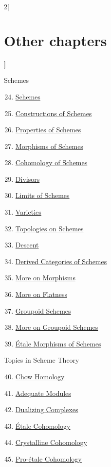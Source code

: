 \begin{multicols}{2}[\section{Other chapters}]
\begin{enumerate}
\end{enumerate}
Schemes
\begin{enumerate}
\setcounter{enumi}{23}
\item \hyperref[schemes-section-phantom]{Schemes}
\item \hyperref[constructions-section-phantom]{Constructions of Schemes}
\item \hyperref[properties-section-phantom]{Properties of Schemes}
\item \hyperref[morphisms-section-phantom]{Morphisms of Schemes}
\item \hyperref[coherent-section-phantom]{Cohomology of Schemes}
\item \hyperref[divisors-section-phantom]{Divisors}
\item \hyperref[limits-section-phantom]{Limits of Schemes}
\item \hyperref[varieties-section-phantom]{Varieties}
\item \hyperref[topologies-section-phantom]{Topologies on Schemes}
\item \hyperref[descent-section-phantom]{Descent}
\item \hyperref[perfect-section-phantom]{Derived Categories of Schemes}
\item \hyperref[more-morphisms-section-phantom]{More on Morphisms}
\item \hyperref[flat-section-phantom]{More on Flatness}
\item \hyperref[groupoids-section-phantom]{Groupoid Schemes}
\item \hyperref[more-groupoids-section-phantom]{More on Groupoid Schemes}
\item \hyperref[etale-section-phantom]{\'Etale Morphisms of Schemes}
\end{enumerate}
Topics in Scheme Theory
\begin{enumerate}
\setcounter{enumi}{39}
\item \hyperref[chow-section-phantom]{Chow Homology}
\item \hyperref[adequate-section-phantom]{Adequate Modules}
\item \hyperref[dualizing-section-phantom]{Dualizing Complexes}
\item \hyperref[etale-cohomology-section-phantom]{\'Etale Cohomology}
\item \hyperref[crystalline-section-phantom]{Crystalline Cohomology}
\item \hyperref[proetale-section-phantom]{Pro-\'etale Cohomology}
\end{enumerate}

\end{multicols}

